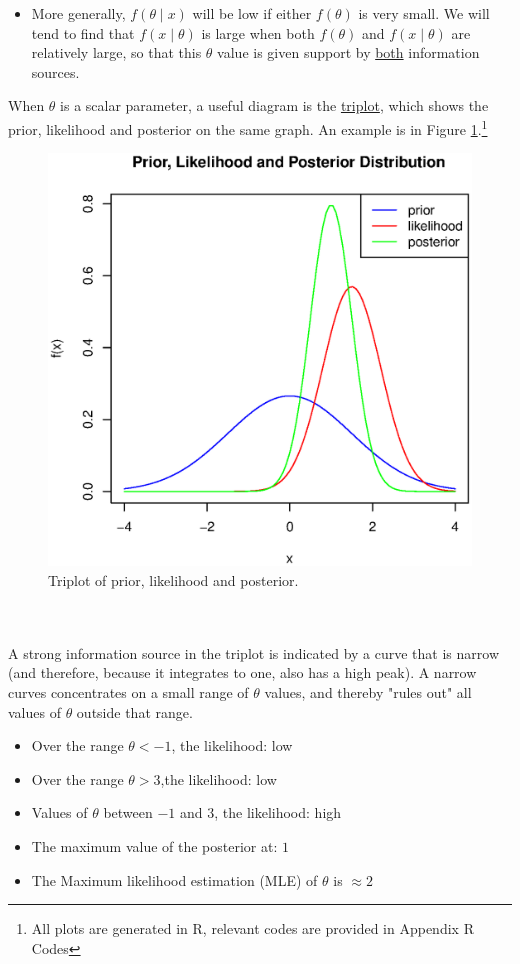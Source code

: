 \documentclass[lecture,12pt,]{pcms-l}
\numberwithin{section}{chapter}
\numberwithin{equation}{chapter}
\theoremstyle{plain}
\theoremstyle{definition}
\theoremstyle{definition}
\begin{document}
\begin{itemize}
\item More generally, $f(\theta \mid x)$ will be low if either $f(\theta)$ is very small.  We will tend to find that $f(x \mid \theta)$ is large when both $f(\theta)$ and $f(x \mid \theta)$ are relatively large, so that this $\theta$ value is given support by \underline{both} information sources.
\end{itemize}
When $\theta$ is a scalar parameter, a useful diagram is the \underline{triplot}, which shows the prior, likelihood and posterior on the same graph. An example is in Figure \ref{fig:Triplot}.\footnote{All plots are generated in R, relevant codes are provided in Appendix R Codes }
\begin{figure}
\centering
 \includegraphics[scale=0.7]{triplot}%
  \caption{Triplot of prior, likelihood and posterior. }
\label{fig:Triplot}
\end{figure} 
\\
\\
A strong information source in the triplot is indicated by a curve that is narrow (and therefore, because it integrates to one, also has a high peak). A narrow curves concentrates on a small range of $\theta$ values, and thereby "rules out" all values of $\theta$ outside that range.

\vfill
\eject
\begin{itemize}
\item Over the range $\theta<-1$, the likelihood: low
\item Over the range $\theta>3$,the likelihood: low
\item Values of $\theta$ between $-1$ and $3$, the likelihood: high
\item The maximum value of the posterior at: $1$
\item The Maximum likelihood estimation (MLE) of $\theta$ is $\approx 2$
\end{itemize}
\end{document}
